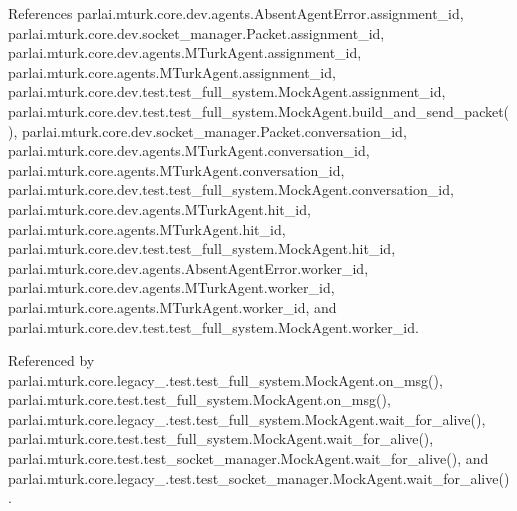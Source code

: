 References parlai.\+mturk.\+core.\+dev.\+agents.\+Absent\+Agent\+Error.\+assignment\+\_\+id, parlai.\+mturk.\+core.\+dev.\+socket\+\_\+manager.\+Packet.\+assignment\+\_\+id, parlai.\+mturk.\+core.\+dev.\+agents.\+M\+Turk\+Agent.\+assignment\+\_\+id, parlai.\+mturk.\+core.\+agents.\+M\+Turk\+Agent.\+assignment\+\_\+id, parlai.\+mturk.\+core.\+dev.\+test.\+test\+\_\+full\+\_\+system.\+Mock\+Agent.\+assignment\+\_\+id, parlai.\+mturk.\+core.\+dev.\+test.\+test\+\_\+full\+\_\+system.\+Mock\+Agent.\+build\+\_\+and\+\_\+send\+\_\+packet(), parlai.\+mturk.\+core.\+dev.\+socket\+\_\+manager.\+Packet.\+conversation\+\_\+id, parlai.\+mturk.\+core.\+dev.\+agents.\+M\+Turk\+Agent.\+conversation\+\_\+id, parlai.\+mturk.\+core.\+agents.\+M\+Turk\+Agent.\+conversation\+\_\+id, parlai.\+mturk.\+core.\+dev.\+test.\+test\+\_\+full\+\_\+system.\+Mock\+Agent.\+conversation\+\_\+id, parlai.\+mturk.\+core.\+dev.\+agents.\+M\+Turk\+Agent.\+hit\+\_\+id, parlai.\+mturk.\+core.\+agents.\+M\+Turk\+Agent.\+hit\+\_\+id, parlai.\+mturk.\+core.\+dev.\+test.\+test\+\_\+full\+\_\+system.\+Mock\+Agent.\+hit\+\_\+id, parlai.\+mturk.\+core.\+dev.\+agents.\+Absent\+Agent\+Error.\+worker\+\_\+id, parlai.\+mturk.\+core.\+dev.\+agents.\+M\+Turk\+Agent.\+worker\+\_\+id, parlai.\+mturk.\+core.\+agents.\+M\+Turk\+Agent.\+worker\+\_\+id, and parlai.\+mturk.\+core.\+dev.\+test.\+test\+\_\+full\+\_\+system.\+Mock\+Agent.\+worker\+\_\+id.



Referenced by parlai.\+mturk.\+core.\+legacy\+\_.\+test.\+test\+\_\+full\+\_\+system.\+Mock\+Agent.\+on\+\_\+msg(), parlai.\+mturk.\+core.\+test.\+test\+\_\+full\+\_\+system.\+Mock\+Agent.\+on\+\_\+msg(), parlai.\+mturk.\+core.\+legacy\+\_.\+test.\+test\+\_\+full\+\_\+system.\+Mock\+Agent.\+wait\+\_\+for\+\_\+alive(), parlai.\+mturk.\+core.\+test.\+test\+\_\+full\+\_\+system.\+Mock\+Agent.\+wait\+\_\+for\+\_\+alive(), parlai.\+mturk.\+core.\+test.\+test\+\_\+socket\+\_\+manager.\+Mock\+Agent.\+wait\+\_\+for\+\_\+alive(), and parlai.\+mturk.\+core.\+legacy\+\_.\+test.\+test\+\_\+socket\+\_\+manager.\+Mock\+Agent.\+wait\+\_\+for\+\_\+alive().


